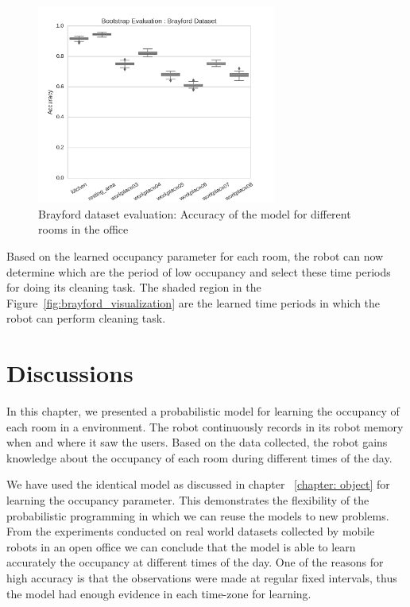 \begin{figure}[htp]
\centering
\includegraphics[width=0.7\textwidth]{images/Brayford_dataset_results_evaluation.png}
\caption[Brayford Dataset Evaluation]{Brayford dataset evaluation: Accuracy of the model for different rooms in the office}
\label{fig:brayford_evaluation}
\end{figure}



Based on the learned occupancy parameter for each room, the robot can now determine which are the period of low occupancy and select these time periods for doing its cleaning task. The shaded region in the Figure~\ref{fig:brayford_visualization} are the learned time periods in which the robot can perform cleaning task.
\FloatBarrier

\section{Discussions}

In this chapter, we presented a probabilistic model for learning the occupancy of each room in a environment. The robot continuously records in its robot memory when and where it saw the users. Based on the data collected, the robot gains knowledge about the occupancy of each room during different times of the day.

We have used the identical model as discussed in chapter ~\ref{chapter: object} for learning the occupancy parameter. This demonstrates the flexibility of the probabilistic programming in which we can reuse the models to new problems.
From the experiments conducted on real world datasets collected by mobile robots in an open office we can conclude that the model is able to learn accurately the occupancy at different times of the day. One of the reasons for high accuracy is that the observations were made at regular fixed intervals, thus the model had enough evidence in each time-zone for learning.